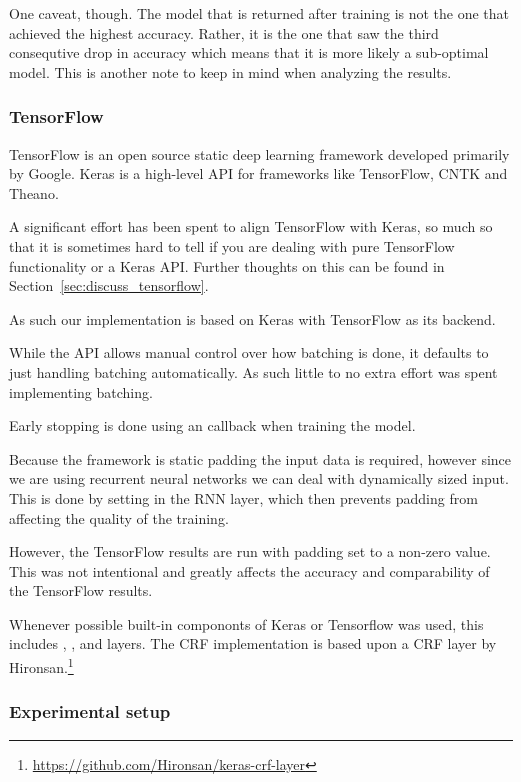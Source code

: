 One caveat, though. The model that is returned after training is not the one
that achieved the highest accuracy. Rather, it is the one that saw the third
consequtive drop in accuracy which means that it is more likely a sub-optimal
model. This is another note to keep in mind when analyzing the results.


\subsubsection*{TensorFlow}
TensorFlow is an open source static deep learning framework developed primarily
by Google. Keras is a high-level API for frameworks like TensorFlow, CNTK and
Theano.

A significant effort has been spent to align TensorFlow with Keras, so much so
that it is sometimes hard to tell if you are dealing with pure TensorFlow
functionality or a Keras API\@. Further thoughts on this can be found in
Section~\ref{sec:discuss_tensorflow}.

As such our implementation is based on Keras with TensorFlow as its
backend.

While the API allows manual control over how batching is done, it defaults to
just handling batching automatically. As such little to no extra effort was
spent implementing batching.

Early stopping is done using an  callback when training the
model.

Because the framework is static padding the input data is required, however
since we are using recurrent neural networks we can deal with dynamically sized
input. This is done by setting  in the RNN layer, which
then prevents padding from affecting the quality of the training.

However, the TensorFlow results are run with padding set to a non-zero value.
This was not intentional and greatly affects the accuracy and comparability of
the TensorFlow results.

Whenever possible built-in compononts of Keras or Tensorflow was used, this
includes , ,  and  layers.
The CRF implementation is based upon a CRF layer by
Hironsan.\footnote{\url{https://github.com/Hironsan/keras-crf-layer}}

\subsubsection{Experimental setup}

